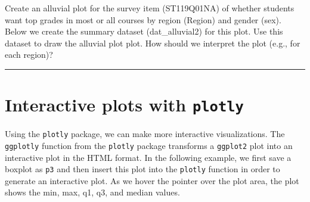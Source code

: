 \documentclass[]{book}
\newenvironment{Shaded}{\begin{snugshade}}{\end{snugshade}}
\newcommand{\DataTypeTok}[1]{\textcolor[rgb]{0.13,0.29,0.53}{#1}}
\newcommand{\ErrorTok}[1]{\textcolor[rgb]{0.64,0.00,0.00}{\textbf{#1}}}
\newcommand{\KeywordTok}[1]{\textcolor[rgb]{0.13,0.29,0.53}{\textbf{#1}}}
\newcommand{\NormalTok}[1]{#1}
\newcommand{\OperatorTok}[1]{\textcolor[rgb]{0.81,0.36,0.00}{\textbf{#1}}}
\newcommand{\StringTok}[1]{\textcolor[rgb]{0.31,0.60,0.02}{#1}}
\begin{document}
Create an alluvial plot for the survey item (ST119Q01NA) of whether students want top grades in most or all courses by region (Region) and gender (sex). Below we create the summary dataset (dat\_alluvial2) for this plot. Use this dataset to draw the alluvial plot plot. How should we interpret the plot (e.g., for each region)?

\begin{Shaded}
\end{Shaded}

\begin{center}\rule{0.5\linewidth}{\linethickness}\end{center}

\hypertarget{interactive-plots-with-plotly}{%
\section{\texorpdfstring{Interactive plots with \texttt{plotly}}{Interactive plots with plotly}}\label{interactive-plots-with-plotly}}

Using the \texttt{plotly} package, we can make more interactive visualizations. The \texttt{ggplotly} function from the \texttt{plotly} package transforms a \texttt{ggplot2} plot into an interactive plot in the HTML format. In the following example, we first save a boxplot as \texttt{p3} and then insert this plot into the \texttt{plotly} function in order to generate an interactive plot. As we hover the pointer over the plot area, the plot shows the min, max, q1, q3, and median values.
\end{document}
